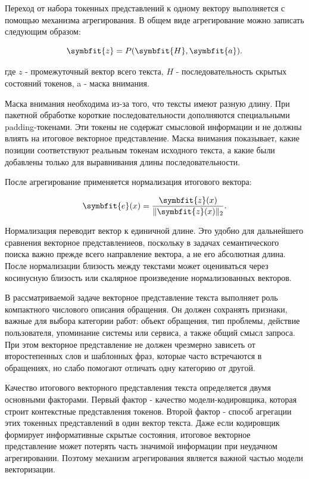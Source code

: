 \documentclass[14pt,a4paper]{extarticle}
\numberwithin{figure}{section}
\numberwithin{table}{section}
\begin{document}
Переход от набора токенных представлений к одному вектору выполняется с
помощью механизма агрегирования. В общем виде агрегирование можно записать следующим
образом:

\begin{equation}\symbfit{z}=P(\symbfit{H},\symbfit{a}).\label{eq:pooling-general}\end{equation}

где \(z\) - промежуточный вектор всего текста, \(H\) -
последовательность скрытых состояний токенов, a - маска внимания.

Маска внимания необходима из-за того, что тексты имеют разную длину. При
пакетной обработке короткие последовательности дополняются специальными
padding-токенами. Эти токены не содержат смысловой информации и не
должны влиять на итоговое векторное представление. Маска внимания показывает, какие
позиции соответствуют реальным токенам исходного текста, а какие были
добавлены только для выравнивания длины последовательности.

После агрегирование применяется нормализация итогового вектора:

\begin{equation}\symbfit{e}(x)=\frac{\symbfit{z}(x)}{\|\symbfit{z}(x)\|_2}.\end{equation}

Нормализация переводит вектор к единичной длине. Это удобно для
дальнейшего сравнения векторное представлениеов, поскольку в задачах
семантического поиска важно прежде всего направление вектора, а не его
абсолютная длина. После нормализации близость между текстами может
оцениваться через косинусную близость или скалярное произведение
нормализованных векторов.

В рассматриваемой задаче векторное представление текста выполняет роль компактного
числового описания обращения. Он должен сохранять признаки, важные для
выбора категории работ: объект обращения, тип проблемы, действие
пользователя, упоминание системы или сервиса, а также общий смысл
запроса. При этом векторное представление не должен чрезмерно зависеть от
второстепенных слов и шаблонных фраз, которые часто встречаются в
обращениях, но слабо помогают отличать одну категорию от другой.

Качество итогового векторного представления текста определяется двумя основными
факторами. Первый фактор - качество модели-кодировщика, которая строит
контекстные представления токенов. Второй фактор - способ агрегации этих
токенных представлений в один вектор текста. Даже если кодировщик формирует
информативные скрытые состояния, итоговое векторное представление может потерять часть
значимой информации при неудачном агрегировании. Поэтому механизм агрегирования
является важной частью модели векторизации.
\end{document}

